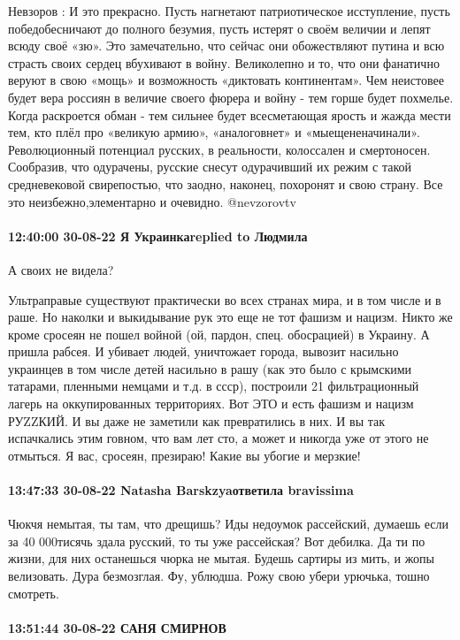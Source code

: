 Невзоров : И это прекрасно. Пусть нагнетают патриотическое исступление, пусть победобесничают до полного безумия, пусть истерят о своём величии и лепят всюду своё «зю».
Это замечательно, что сейчас они обожествляют путина и всю страсть своих сердец вбухивают в войну. Великолепно и то, что они фанатично веруют в свою «мощь» и возможность «диктовать континентам».
Чем неистовее будет вера россиян в величие своего фюрера и войну - тем горше будет похмелье.
Когда раскроется обман - тем сильнее будет всесметающая ярость и жажда мести тем, кто плёл про «великую армию», «аналоговнет» и «мыещененачинали».
Революционный потенциал русских, в реальности, колоссален и смертоносен. Сообразив, что одурачены, русские снесут одурачивший их режим с такой средневековой свирепостью, что заодно, наконец, похоронят и свою страну. Все это неизбежно,элементарно и очевидно.
@nevzorovtv

\paragraph{12:40:00 30-08-22 Я Украинкаreplied to Людмила}

А своих не видела?

Ультраправые существуют практически во всех странах мира, и в том числе и в
раше. Но наколки и выкидывание рук это еще не тот фашизм и нацизм. Никто же
кроме сросеян не пошел войной (ой, пардон, спец. обосрацией) в Украину. А
пришла рабсея. И убивает людей, уничтожает города, вывозит насильно украинцев в
том числе детей насильно в рашу (как это было с крымскими татарами, пленными
немцами и т.д. в ссср), построили 21 фильтрационный лагерь на оккупированных
территориях. Вот ЭТО и есть фашизм и нацизм РУZZКИЙ. И вы даже не заметили как
превратились в них. И вы так испачкались этим говном, что вам лет сто, а может
и никогда уже от этого не отмыться. Я вас, сросеян, презираю! Какие вы убогие и
мерзкие!

\paragraph{13:47:33 30-08-22 Natasha Barskzyaответила bravissima}

Чюкчя немытая, ты там, что дрещишь? Иды недоумок рассейский, думаешь если за 40
000тисячь здала русский, то ты уже рассейская? Вот дебилка. Да ти по жизни, для
них останешься чюрка не мытая. Будешь сартиры из мить, и жопы велизовать. Дура
безмозглая. Фу, ублюдша. Рожу свою убери урючька, тошно смотреть.

\paragraph{13:51:44 30-08-22 САНЯ СМИРНОВ}

